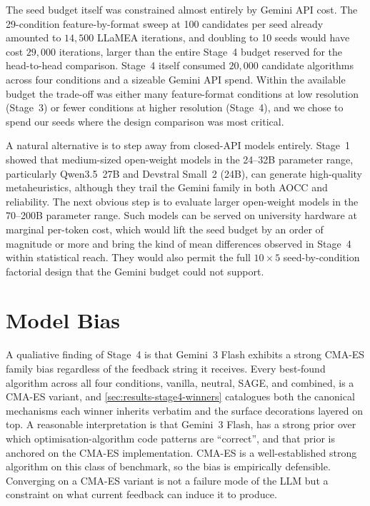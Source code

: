 The seed budget itself was constrained almost entirely by Gemini API cost. The 29-condition feature-by-format sweep at 100 candidates per seed already amounted to $14{,}500$ LLaMEA iterations, and doubling to 10 seeds would have cost $29{,}000$ iterations, larger than the entire Stage~4 budget reserved for the head-to-head comparison. Stage~4 itself consumed $20{,}000$ candidate algorithms across four conditions and a sizeable Gemini API spend. Within the available budget the trade-off was either many feature-format conditions at low resolution (Stage~3) or fewer conditions at higher resolution (Stage~4), and we chose to spend our seeds where the design comparison was most critical.

A natural alternative is to step away from closed-API models entirely. Stage~1 showed that medium-sized open-weight models in the 24--32B parameter range, particularly Qwen3.5~27B and Devstral Small~2 (24B), can generate high-quality metaheuristics, although they trail the Gemini family in both AOCC and reliability. The next obvious step is to evaluate larger open-weight models in the 70--200B parameter range. Such models can be served on university hardware at marginal per-token cost, which would lift the seed budget by an order of magnitude or more and bring the kind of mean differences observed in Stage~4 within statistical reach. They would also permit the full $10 \times 5$ seed-by-condition factorial design that the Gemini budget could not support.

\section{Model Bias}
\label{sec:discussion-bias}

A qualiative finding of Stage~4 is that Gemini~3 Flash exhibits a strong CMA-ES family bias regardless of the feedback string it receives. Every best-found algorithm across all four conditions, vanilla, neutral, SAGE, and combined, is a CMA-ES variant, and \cref{sec:results-stage4-winners} catalogues both the canonical mechanisms each winner inherits verbatim and the surface decorations layered on top. A reasonable interpretation is that Gemini~3 Flash, has a strong prior over which optimisation-algorithm code patterns are ``correct'', and that prior is anchored on the CMA-ES implementation. CMA-ES is a well-established strong algorithm on this class of benchmark, so the bias is empirically defensible. Converging on a CMA-ES variant is not a failure mode of the LLM but a constraint on what current feedback can induce it to produce.

